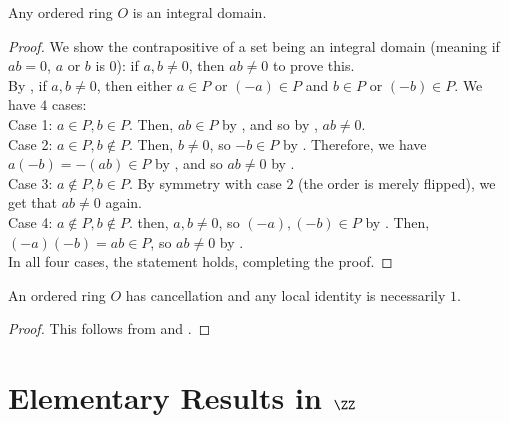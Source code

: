 \begin{theorem}\label{ordered-rings-int-dom}
Any ordered ring $O$ is an integral domain.
\end{theorem}
\begin{proof}
    We show the contrapositive of a set being an integral domain (meaning if $ab = 0$, $a$ or $b$ is $0$): if $a, b \neq 0$, then $ab \neq 0$ to prove this. \\

    By , if $a,b \neq 0$, then either $a \in P$ or $(-a) \in P$ and $b \in P$ or $(-b) \in P$. We have $4$ cases: \\
    
    Case 1: $a \in P, b \in P$. Then, $ab \in P$ by , and so by , $ab \neq 0$. \\
    
    Case 2: $a \in P, b \notin P$. Then, $b \neq 0$, so $-b \in P$ by . Therefore, we have $a(-b) = -(ab) \in P$ by , and so $ab \neq 0$ by . \\
    
    Case 3: $a \notin P, b \in P$. By symmetry with case $2$ (the order is merely flipped), we get that $ab \neq 0$ again. \\
    
    Case 4: $a \notin P, b \notin P$. then, $a, b \neq 0$, so $(-a), (-b) \in P$ by . Then, $(-a)(-b) = ab \in P$, so $ab \neq 0$ by . \\

    In all four cases, the statement holds, completing the proof.
\end{proof}

\begin{corollary}
An ordered ring $O$ has cancellation and any local identity is necessarily $1$.
\end{corollary}

\begin{proof}
    This follows from  and . 
\end{proof}

    
\newpage

\section{Elementary Results in $\ZZ$}


